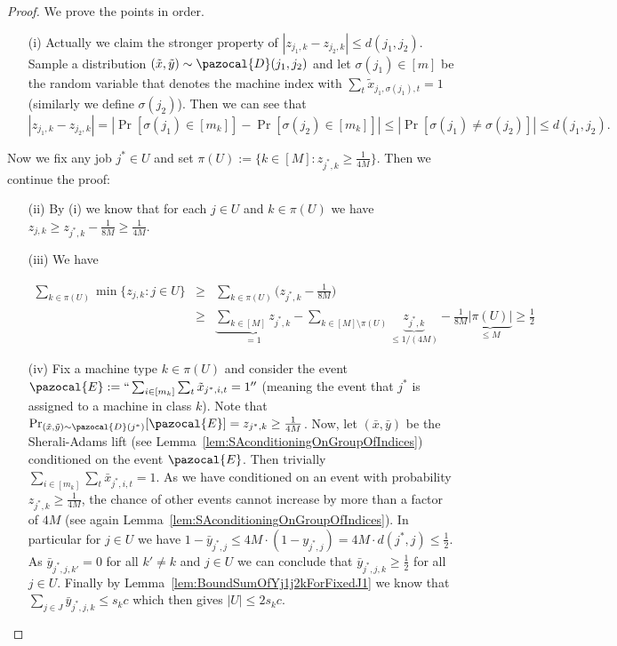   
  \begin{proof}
  We prove the points in order.
  \begin{enumerate}
  \item[(i)] Actually we claim the stronger property of $|z_{j_1,k} - z_{j_2,k}| \leq d(j_1,j_2)$.
  Sample a distribution $(\tilde{x},\tilde{y}) \sim \pazocal{D}(j_1,j_2)$ and let $\sigma(j_1) \in [m]$ be the random variable that denotes the machine index with $\sum_t \tilde{x}_{j_1,\sigma(j_1),t}=1$ (similarly we define $\sigma(j_2)$). 
  Then we can see that
  \[
  |z_{j_1,k}-z_{j_2,k}| = |\Pr[\sigma(j_1) \in [m_k]] -
  \Pr[\sigma(j_2) \in [m_k]]| \leq |\Pr[\sigma(j_1) \neq \sigma(j_2)]|
  \leq d(j_1,j_2).
  \]
  \end{enumerate}
  Now we fix any job $j^* \in U$ and set $\pi(U) := \{ k \in [M] : z_{j^*,k} \geq \frac{1}{4M} \}$. 
  Then we continue the proof:
  \begin{enumerate}
  \item[(ii)] By (i) we know that for each $j \in U$ and $k \in \pi(U)$ we have $z_{j,k} \geq z_{j^*,k} - \frac{1}{8M} \geq \frac{1}{4M}$.
  \item[(iii)] We have
  
  \begin{eqnarray*}
  \sum_{k \in \pi(U)} \min\{ z_{j,k} : j \in U\} &\geq&
  \sum_{k \in \pi(U)} \Big(z_{j^*,k}-\frac{1}{8M}\Big) \\ &\geq&
  \underbrace{\sum_{k \in [M]} z_{j^*,k}}_{=1} - \sum_{k \in [M] \setminus
  \pi(U)} \underbrace{z_{j^*,k}}_{\leq 1/(4M)} - \frac{1}{8M}
  \underbrace{|\pi(U)|}_{\leq M} \geq \frac{1}{2}
  \end{eqnarray*}
  
  \item[(iv)] Fix a machine type $k \in \pi(U)$ and consider the event $\pazocal{E} := ``\sum_{i \in [m_k]}\sum_{t} \tilde{x}_{j^*,i,t}=1''$ (meaning the event that $j^*$ is assigned to a machine in class  $k$). 
  Note that $\Pr_{(\tilde{x},\tilde{y}) \sim \pazocal{D}(j^*)}[\pazocal{E}] = z_{j^*,k} \geq \frac{1}{4M}$. 
  Now, let $(\bar{x},\bar{y})$ be the Sherali-Adams lift (see Lemma~\ref{lem:SAconditioningOnGroupOfIndices}) conditioned on the event $\pazocal{E}$. Then trivially $\sum_{i \in [m_k]}\sum_t  \bar{x}_{j^*,i,t} = 1$. 
  As we have conditioned on an event with probability $z_{j^*,k} \geq \frac{1}{4M}$, the chance of other events cannot increase by more than a factor of $4M$ (see again Lemma~\ref{lem:SAconditioningOnGroupOfIndices}).
  In particular for $j \in U$ we have $1 - \bar{y}_{j^*,j} \leq 4M \cdot (1-y_{j^*,j}) = 4M \cdot d(j^*,j) \leq \frac{1}{2}$.
  As $\bar{y}_{j^*,j,k'} = 0$ for all $k' \neq k$ and $j \in U$ we can conclude that $\bar{y}_{j^*,j,k} \geq \frac{1}{2}$ for all $j \in U$.
  Finally by Lemma~\ref{lem:BoundSumOfYj1j2kForFixedJ1} we know that $\sum_{j \in J} \bar{y}_{j^*,j,k} \leq s_k c$ which then gives $|U| \leq 2s_kc$.
  \end{enumerate}
  \end{proof}
  
